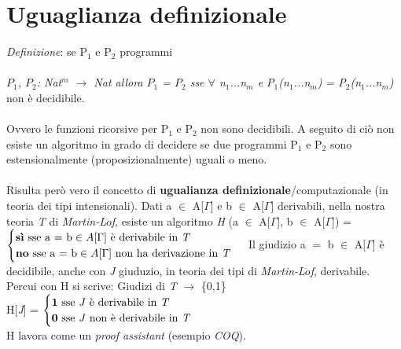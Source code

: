 \section{Uguaglianza definizionale}
\label{sec: uguaglianza-definizionale}
\textit{Definizione}: se P$_1$ e P$_2$ programmi\\\\
\textit{$P_1$, $P_2$: Nat$^m$  $\rightarrow$ Nat \quad allora \quad
$P_1$ = $P_2$ sse $\forall$ n$_1$...n$_m$ e P$_1$(n$_1$...n$_m$) = P$_2$(n$_1$...n$_m$)} non \`e decidibile.\\\\
Ovvero le funzioni ricorsive per P$_1$ e P$_2$ non sono decidibili. A seguito di ci\`o non esiste un algoritmo in grado di decidere se due programmi P$_1$ e P$_2$ sono estensionalmente (proposizionalmente) uguali o meno.\\\\
Risulta per\`o vero il concetto di \textbf{ugualianza definizionale}/computazionale (in teoria dei tipi intensionali). Dati a $\in$ A[$\Gamma$] e b $\in$ A[$\Gamma$] derivabili, nella nostra teoria \textit{T} di \textit{Martin-L$\ddot{o}$f}, esiste un algoritmo \textit{H} (a $\in$ A[$\Gamma$], b $\in$ A[$\Gamma$]) =
$
\begin{cases}
\text{\textbf{sì} sse a = b} \in A[\Gamma]  \text{ è derivabile in \textit{T}} \\
\text{\textbf{no} sse a = b} \in A[\Gamma] \text{ non ha derivazione in \textit{T}}
\end{cases}
$
Il giudizio a $=$ b $\in$ A[$\Gamma$] \`e decidibile, anche con \textit{J} giuduzio, in teoria dei tipi di \textit{Martin-L$\ddot{o}$f}, derivabile. Percui con H si scrive: Giudizi di \textit{T} $\rightarrow$ \{0,1\}\\
H[\textit{J}] =
$
\begin{cases}
\textbf{1} \text{ sse \textit{J} è derivabile in \textit{T}}  \\
\textbf{0} \text{ sse \textit{J} non è derivabile in \textit{T}}
\end{cases}
$
\\
H lavora come un \textit{proof assistant} (esempio \textit{COQ}).\\\\
\noindent

